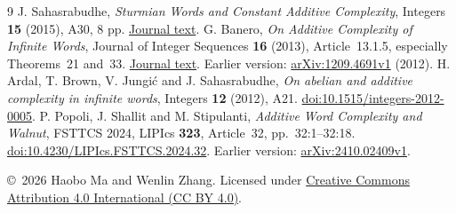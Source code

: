 \documentclass[11pt]{article}
\begin{document}
\begin{thebibliography}{9}
 J. Sahasrabudhe,
\emph{Sturmian Words and Constant Additive Complexity},
Integers \textbf{15} (2015), A30, 8 pp.
\href{https://math.colgate.edu/~integers/p30/p30.pdf}{Journal text}.
 G. Banero,
\emph{On Additive Complexity of Infinite Words},
Journal of Integer Sequences \textbf{16} (2013), Article~13.1.5,
especially Theorems~21 and~33.
\href{https://cs.uwaterloo.ca/journals/JIS/VOL16/Banero/banero3.pdf}{Journal text}.
Earlier version: \href{https://arxiv.org/abs/1209.4691v1}{arXiv:1209.4691v1} (2012).
 H. Ardal, T. Brown, V. Jungi\'c and J. Sahasrabudhe,
\emph{On abelian and additive complexity in infinite words},
Integers \textbf{12} (2012), A21.
\href{https://doi.org/10.1515/integers-2012-0005}{doi:10.1515/integers-2012-0005}.
 P. Popoli, J. Shallit and M. Stipulanti,
\emph{Additive Word Complexity and Walnut},
FSTTCS 2024, LIPIcs \textbf{323}, Article~32, pp.~32:1--32:18.
\href{https://doi.org/10.4230/LIPIcs.FSTTCS.2024.32}{doi:10.4230/LIPIcs.FSTTCS.2024.32}.
Earlier version: \href{https://arxiv.org/abs/2410.02409v1}{arXiv:2410.02409v1}.
\end{thebibliography}
\medskip\noindent\small
\copyright\ 2026 Haobo Ma and Wenlin Zhang.
Licensed under \href{https://creativecommons.org/licenses/by/4.0/}{Creative Commons Attribution 4.0 International (CC BY 4.0)}.
\end{document}
